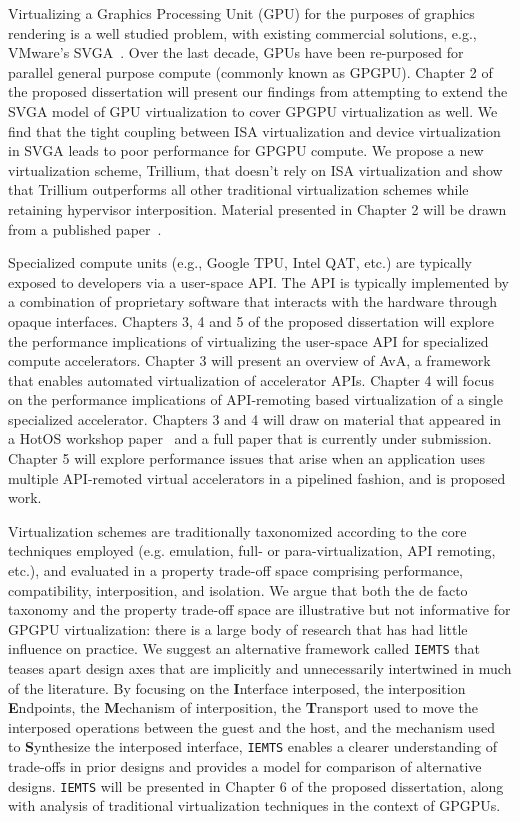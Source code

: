 Virtualizing a Graphics Processing Unit (GPU) for the purposes of graphics
rendering is a well studied problem, with existing commercial solutions, e.g.,
VMware’s SVGA~\cite{dowty2009gpu}. Over the last decade, GPUs have been
re-purposed for parallel general purpose compute (commonly known as GPGPU).
Chapter 2 of the proposed dissertation will present our findings from
attempting to extend the SVGA model of GPU virtualization to cover GPGPU
virtualization as well. We find that the tight coupling between ISA
virtualization and device virtualization in SVGA leads to poor performance for
GPGPU compute. We propose a new virtualization scheme, Trillium, that doesn’t
rely on ISA virtualization and show that Trillium outperforms all other
traditional virtualization schemes while retaining hypervisor interposition.
Material presented in Chapter 2 will be drawn from a published paper~\cite{trillium}.

Specialized compute units (e.g., Google TPU, Intel QAT, etc.) are
typically exposed to developers via a user-space API. The API is typically
implemented by a combination of proprietary software that interacts with the
hardware through opaque interfaces.
Chapters 3, 4 and 5 of the proposed dissertation will explore the performance
implications of virtualizing the user-space API for specialized compute
accelerators.
Chapter 3 will present an overview of AvA, a framework that enables automated
virtualization of accelerator APIs. Chapter 4 will focus on the performance
implications of API-remoting based virtualization of a single specialized
accelerator. Chapters 3 and 4 will draw on material that appeared in a HotOS
workshop paper~\cite{ava-hotos} and a full paper that is currently under
submission. Chapter 5 will explore performance issues that arise when an
application uses multiple API-remoted virtual accelerators in a pipelined
fashion, and is proposed work.

Virtualization schemes are traditionally taxonomized according to the core
techniques employed (e.g. emulation, full- or para-virtualization, API
remoting, etc.), and evaluated in a property trade-off space comprising
performance, compatibility, interposition, and isolation. We argue that both
the de facto taxonomy and the property trade-off space are illustrative but
not informative for GPGPU virtualization: there is a large body of research
that has had little influence on practice. We suggest an alternative framework
called \texttt{IEMTS} that teases apart design axes that are implicitly and
unnecessarily intertwined in much of the literature. By focusing on the
\textbf{I}nterface interposed, the interposition \textbf{E}ndpoints, the
\textbf{M}echanism of interposition, the \textbf{T}ransport used to move the
interposed operations between the guest and the host, and the mechanism used
to \textbf{S}ynthesize the interposed interface, \texttt{IEMTS} enables a
clearer understanding of trade-offs in prior designs and provides a model for
comparison of alternative designs. \texttt{IEMTS} will be presented in Chapter
6 of the proposed dissertation, along with analysis of traditional
virtualization techniques in the context of GPGPUs.

